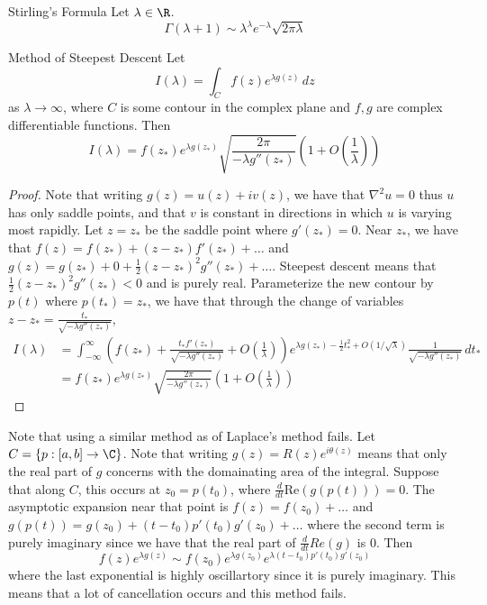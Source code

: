 \documentclass[a4paper]{article}
\begin{document}
\begin{lmm}{Stirling's Formula}{} Let $\lambda\in\R$. $$\Gamma(\lambda+1)\sim\lambda^{\lambda}e^{-\lambda}\sqrt{2\pi\lambda}$$
\end{lmm}

\begin{thm}{Method of Steepest Descent}{} Let $$I(\lambda)=\int_Cf(z)e^{\lambda g(z)}\,dz$$ as $\lambda\to\infty$, where $C$ is some contour in the complex plane and $f,g$ are complex differentiable functions. Then $$I(\lambda)=f(z_\ast)e^{\lambda g(z_\ast)}\sqrt{\frac{2\pi}{-\lambda g''(z_\ast)}}\left(1+O\left(\frac{1}{\lambda}\right)\right)$$ \tcbline
\begin{proof}
Note that writing $g(z)=u(z)+iv(z)$, we have that $\nabla^2u=0$ thus $u$ has only saddle points, and that $v$ is constant in directions in which $u$ is varying most rapidly. Let $z=z_\ast$ be the saddle point where $g'(z_\ast)=0$. Near $z_\ast$, we have that $f(z)=f(z_\ast)+(z-z_\ast)f'(z_\ast)+\dots$ and $g(z)=g(z_\ast)+0+\frac{1}{2}(z-z_\ast)^2g''(z_\ast)+\dots$. Steepest descent means that $\frac{1}{2}(z-z_\ast)^2g''(z_\ast)<0$ and is purely real. Parameterize the new contour by $p(t)$ where $p(t_\ast)=z_\ast$, we have that through the change of variables $z-z_\ast=\frac{t_\ast}{\sqrt{-\lambda g''(z_\ast)}}$, 
\begin{align*}
I(\lambda)&=\int_{-\infty}^\infty\left(f(z_\ast)+\frac{t_\ast f'(z_\ast)}{\sqrt{-\lambda g''(z_\ast)}}+O\left(\frac{1}{\lambda}\right)\right)e^{\lambda g(z_\ast)-\frac{1}{2}t_\ast^2+O(1/\sqrt{\lambda})}\frac{1}{\sqrt{-\lambda g''(z_\ast)}}\,dt_\ast\\
&=f(z_\ast)e^{\lambda g(z_\ast)}\sqrt{\frac{2\pi}{-\lambda g''(z_\ast)}}\left(1+O\left(\frac{1}{\lambda}\right)\right)
\end{align*}

\end{proof}
\end{thm}

Note that using a similar method as of Laplace's method fails. Let $C=\{p:[a,b]\to\C\}$. Note that writing $g(z)=R(z)e^{i\theta(z)}$ means that only the real part of $g$ concerns with the domainating area of the integral. Suppose that along $C$, this occurs at $z_0=p(t_0)$, where $\frac{d}{dt}\text{Re}(g(p(t)))=0$. The asymptotic expansion near that point is $f(z)=f(z_0)+\dots$ and $g(p(t))=g(z_0)+(t-t_0)p'(t_0)g'(z_0)+\dots$ where the second term is purely imaginary since we have that the real part of $\frac{d}{dt}Re(g)$ is $0$. Then $$f(z)e^{\lambda g(z)}\sim f(z_0)e^{\lambda g(z_0)}e^{\lambda(t-t_0)p'(t_0)g'(z_0)}$$ where the last exponential is highly oscillartory since it is purely imaginary. This means that a lot of cancellation occurs and this method fails. \\~\\
\end{document}

